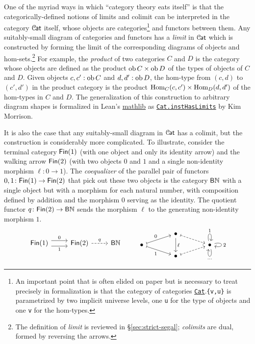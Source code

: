 \documentclass[a4paper,UKenglish,cleveref, autoref, thm-restate]{lipics-v2021}
\newcommand{\ob}{\textup{ob}}
\newcommand{\Hom}{\textup{Hom}}
\newcommand{\cat}[1]{\textup{\textsf{#1}}}%
\newcommand{\NN}{\mathbb{N}}
\newcommand{\1}{\mathbbe{1}}
\newcommand{\2}{\mathbbe{2}}
\newcommand{\3}{\mathbbe{3}}
\newcommand{\Fin}{\cat{Fin}}
\newcommand{\Cat}{\mathcal{C}{\kern-.75pt}\cat{at}}
\newcommand{\libmathlib}{\href{https://github.com/leanprover-community/mathlib}{\textsf{mathlib}}}
\newcommand{\cdoc}[2][]{\href{https://leanprover-community.github.io/mathlib4_docs/find/?pattern=CategoryTheory.#1#2\#doc}{\texttt{#2}}}
\begin{document}
One of the myriad ways in which ``category theory eats itself'' is that the categorically-defined notions of limits and colimit can be interpreted in the category $\Cat$ itself, whose objects are categories\footnote{An important point that is often elided on paper but is necessary to treat precisely in formalization is that the category of categories \cdoc{Cat}.\texttt{\{v,u\}} is parametrized by two implicit universe levels, one \texttt{u} for the type of objects and one \texttt{v} for the hom-types.} and functors between them. Any suitably-small diagram of categories and functors has a \emph{limit} in $\Cat$ which is constructed by forming the limit of the corresponding diagrams of objects and hom-sets.\footnote{The definition of \emph{limit} is reviewed in \S\ref{sec:strict-segal}; \emph{colimits} are dual, formed by reversing the arrows.} For example, the \emph{product} of two categories $C$ and $D$ is the category whose objects are defined as the product $\ob\ \! C \times \ob\,D$ of the types of objects of $C$ and $D$. Given objects $c,c' : \ob\ \! C$ and $d,d' : \ob\,D$, the hom-type from $(c,d)$ to $(c',d')$ in the product category is the product $\Hom_C(c,c') \times \Hom_D(d,d')$ of the hom-types in $C$ and $D$.
The generalization of this construction to arbitrary diagram shapes is formalized in Lean's \libmathlib{} as \cdoc{Cat.instHasLimits} by Kim Morrison.

It is also the case that any suitably-small diagram in $\Cat$ has a colimit, but the construction is considerably more complicated. To illustrate, consider the terminal category $\Fin(1)$ (with one object and only its identity arrow) and the walking arrow $\Fin(2)$ (with two objects $0$ and $1$ and a single non-identity morphism $\ell \colon 0 \to 1$). The \emph{coequalizer} of the parallel pair of functors $0,1 \colon \Fin(1) \to \Fin(2)$ that pick out these two objects is the category $\cat{B}\NN$ with a single object but with a morphism for each natural number, with composition defined by addition and the morphism $0$ serving as the identity. The quotient functor $q \colon \Fin(2) \to \cat{B}\NN$ sends the morphism $\ell$ to the generating non-identity morphism $1$.
\[ \begin{tikzcd} \Fin(1) \arrow[r, shift left=.4em, "0"] \arrow[r, shift right=.4em, "1"'] & \Fin(2) \arrow[r, dashed, "q"] & \cat{B}\NN \end{tikzcd}  \qquad  \begin{tikzcd}[row sep=tiny, column sep=large] & \bullet \arrow[dd, "\ell"] \arrow[dr, mapsto, dashed]\\ \bullet \arrow[ur, mapsto, "0"] \arrow[dr, mapsto, "1"'] & & \bullet  \arrow[loop above, "1"] \arrow[loop below, "\cdots"] \arrow[loop right, "2"]  \\ & \bullet \arrow[ur, mapsto, dashed]\end{tikzcd} \]
\end{document}
